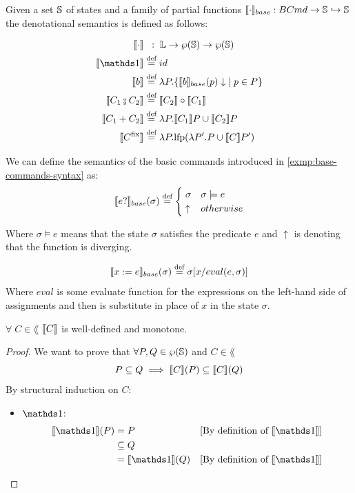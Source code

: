 \documentclass[
  10pt,       %
  twoside,    %
  a4paper,    %
  english,    %
  tikz,       %
  openright,  %
]{book}
\begin{document}
\begin{definition}
  \label{def:deno}
  Given a set $\mathbb{S}$ of states and a family of partial functions
  $\llbracket \cdot \rrbracket_{base} : BCmd \to \mathbb{S} \hookrightarrow \mathbb{S}$ the denotational
  semantics is defined as follows:

  \begin{align*}
      \sem{\cdot}         & \;\;:\; \lang \to \pow{\states} \to \pow{\states} \\
      \sem{\sskip}        &\defeq id \\
      \sem{b}             &\defeq \lambda P . \{ \bsem{b}(p)\downarrow \; \mid 
        p \in P \} \\
      \sem{C_1 \fcmp C_2} &\defeq \sem{C_2} \circ \sem{C_1} \\
      \sem{C_1 + C_2}     &\defeq \lambda P . \sem{C_1} P \cup \sem{C_2} P \\
      \sem{C^\fix}        &\defeq \lambda P . \lfp(\lambda P'. P \cup \sem{C} P')
  \end{align*}

  \begin{example}
    We can define the semantics of the basic commands introduced in 
    \ref{exmp:base-commands-syntax} as:
    $$\llbracket e ? \rrbracket_{base}(\sigma) \stackrel{\text{def}}{=} \begin{cases}
      \; \sigma & \sigma \models e \\
      \; \uparrow & otherwise
    \end{cases}$$

    Where $\sigma \models e$ means that the state $\sigma$ satisfies the 
    predicate $e$ and $\uparrow$ is denoting that the function is diverging.

    $$\llbracket x := e \rrbracket_{base}(\sigma) \stackrel{\text{def}}{=} \sigma[x/eval(e, \sigma)]$$
    Where $eval$ is some evaluate function for the expressions on the left-hand
    side of assignments and then is substitute in place of $x$ in the 
    state $\sigma$.
  \end{example}

  \begin{theorem}[Monotonicity]
    \label{thm:sem-mono}
    $\forall \; C \in \lang$ $\llbracket C \rrbracket$ is well-defined and monotone.
  \end{theorem}
  \begin{proof}
    We want to prove that $\forall P, Q \in \wp(\mathbb{S})$ and $C \in \lang$
    $$P \subseteq Q \implies \llbracket C \rrbracket(P) \subseteq \llbracket C \rrbracket(Q)$$
    By structural induction on $C$:
    \begin{itemize}
      \item $\sskip$:
        \begin{align*}
          \sem{\sskip}(P) 
            &= P
            & \text{[By definition of $\sem{\sskip}$]}\\
            &\subseteq Q \\
            &= \sem{\sskip}(Q) 
            & \text{[By definition of $\sem{\sskip}$]}\\
        \end{align*}


\end{itemize}
\end{proof}
\end{definition}
\end{document}
